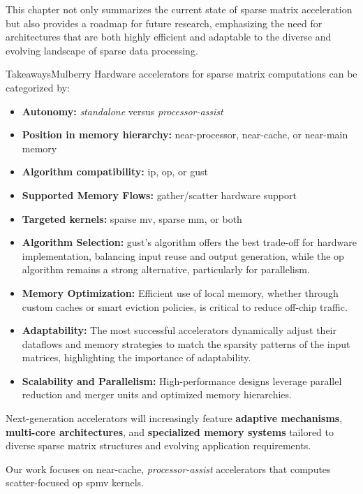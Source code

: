 This chapter not only summarizes the current state of sparse matrix acceleration but also provides a roadmap for future research, emphasizing the need for architectures that are both highly efficient and adaptable to the diverse and evolving landscape of sparse data processing.

\bigskip\bigskip

\begin{highlight}{Takeaways}{Mulberry}
    Hardware accelerators for sparse matrix computations can be categorized by:
    \begin{itemize}
        \item \textbf{Autonomy:} \textit{standalone} versus \textit{processor-assist}
        \item \textbf{Position in memory hierarchy:} near-processor, near-cache, or near-main memory
        \item \textbf{Algorithm compatibility:} \acrfull{ip}, \acrfull{op}, or \acrfull{gust}
        \item \textbf{Supported Memory Flows:} \gls{gather}/\gls{scatter} hardware support
        \item \textbf{Targeted kernels:} sparse \acrfull{mv}, sparse \acrfull{mm}, or both
    \end{itemize}

    \bigskip
    \begin{itemize}
        \item \textbf{Algorithm Selection:} \acrlong{gust}'s algorithm offers the best trade-off for hardware implementation, balancing input reuse and output generation, while the \acrlong{op} algorithm remains a strong alternative, particularly for parallelism.
        \item \textbf{Memory Optimization:} Efficient use of local memory, whether through custom caches or smart \gls{eviction} policies, is critical to reduce off-chip traffic.
        \item \textbf{Adaptability:} The most successful accelerators dynamically adjust their dataflows and memory strategies to match the sparsity patterns of the input matrices, highlighting the importance of adaptability.
        \item \textbf{Scalability and Parallelism:} High-performance designs leverage parallel \gls{reduction} and merger units and optimized memory hierarchies.
    \end{itemize}

    \bigskip
    Next-generation accelerators will increasingly feature \textbf{adaptive mechanisms}, \textbf{multi-core architectures}, and \textbf{specialized memory systems} tailored to diverse sparse matrix structures and evolving application requirements.

    \bigskip
    Our work focuses on near-cache, \textit{processor-assist} accelerators that computes \gls{scatter}-focused \acrlong{op} \acrshort{spmv} kernels.
\end{highlight}

\clearpage